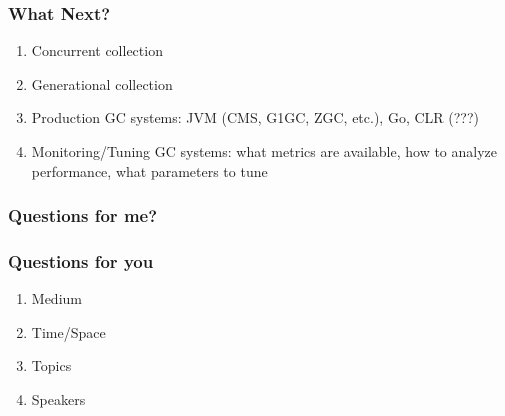 \documentclass{beamer}
\begin{document}
\begin{frame}
  \frametitle{What Next?}
  
  \begin{enumerate}
    \item Concurrent collection
    \item Generational collection
    \item Production GC systems: JVM (CMS, G1GC, ZGC, etc.), Go, CLR (???)
    \item Monitoring/Tuning GC systems: what metrics are available, how to analyze performance, what parameters to tune
  \end{enumerate}
\end{frame}

\begin{frame}
  \frametitle{Questions for me?}
\end{frame}

\begin{frame}
  \frametitle{Questions for you}

  \begin{enumerate}
    \item Medium
    \item Time/Space
    \item Topics
    \item Speakers
  \end{enumerate}
\end{frame}
\end{document}
